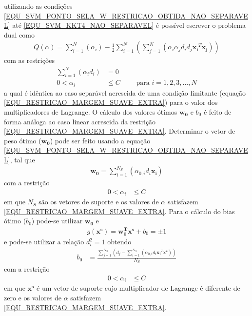 utilizando as condições \eqref{EQU_SVM_PONTO_SELA_W_RESTRICAO_OBTIDA_NAO_SEPARAVEL} até \eqref{EQU_SVM_KKT4_NAO_SEPARAVEL} é possível escrever o problema dual como
\begin{align}
Q(\alpha) = \sum\limits_{i=1}^{N} \left( \alpha_{i} \right) - \frac{1}{2} \sum\limits_{i=1}^{N} \left( \sum\limits_{j=1}^{N} \left( \alpha_{i}\alpha_{j}d_{i}d_{j}\mathbf{x_{i}}^{T}\mathbf{x_{j}} \right) \right) \label{EQU_SVM_OBJETIVO_NAO_SEPARAVEL_DUAL} 
\end{align}
com as restrições
\begin{align}
\sum\limits_{i=1}^{N} \left( \alpha_{i}d_{i} \right) &= 0 \\
0 < \alpha_{i} &\leq C	\qquad \textrm{ para } i = 1, 2, 3, \ldots, N \label{EQU_RESTRICAO_MARGEM_SUAVE_EXTRA}
\end{align}
a qual é idêntica ao caso separável acrescida de uma condição limitante (equação \eqref{EQU_RESTRICAO_MARGEM_SUAVE_EXTRA}) para o valor dos multiplicadores de Lagrange. O cálculo dos valores ótimos \(\mathbf{w_{0}}\) e \(b_{0}\) é feito de forma análoga ao caso linear acrescida da restrição \eqref{EQU_RESTRICAO_MARGEM_SUAVE_EXTRA}. Determinar o vetor de peso ótimo (\(\mathbf{w_{0}}\)) pode ser feito usando a equação \eqref{EQU_SVM_PONTO_SELA_W_RESTRICAO_OBTIDA_NAO_SEPARAVEL}, tal que
\begin{align}
\mathbf{w_{0}} = \sum\limits_{i=1}^{N_{S}} \left( \alpha_{0,i}d_{i}\mathbf{x_{i}} \right) \label{EQU_SVM_W_OTIMO_MARGEM_SUAVE} 
\end{align}
com a restrição
\begin{align}
\nonumber 0 < \alpha_{i} &\leq C
\end{align}
em que \(N_{S}\) são os vetores de suporte e os valores de \(\alpha\) satisfazem \eqref{EQU_RESTRICAO_MARGEM_SUAVE_EXTRA}. Para o cálculo do bias ótimo (\(b_{0}\)) pode-se utilizar \(\mathbf{w_{0}}\) e 
\begin{align}
g(\mathbf{x^{s}}) = \mathbf{w_{0}^{T}}\mathbf{x^{s}} + b_{0} = \pm 1
\end{align}
e pode-se utilizar a relação \(d_{i}^{2} = 1\) obtendo
\begin{align}
b_{0} &= \frac{\sum\limits_{j = 1}^{N_{S}} \left( d_{j} - \sum\limits_{i=1}^{N_{S}} \left( \alpha_{0,i}d_{i}\mathbf{x_{i}}^{T}\mathbf{x^{s}} \right) \right)}{N_{S}} 
\end{align}
com a restrição
\begin{align}
\nonumber 0 < \alpha_{i} &\leq C
\end{align}
em que \(\mathbf{x^{s}}\) é um vetor de suporte cujo multiplicador de Lagrange é diferente de zero e os valores de \(\alpha\) satisfazem \eqref{EQU_RESTRICAO_MARGEM_SUAVE_EXTRA}.

